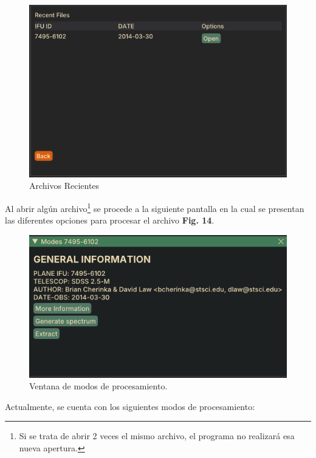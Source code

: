 \documentclass[9pt,twocolumn,a4paper]{opticajnl}
\begin{document}
\begin{figure}
    \centering
    \includegraphics[width=1\linewidth]{recent_files.png}
    \caption{Archivos Recientes}
    \label{fig:recent_files}
\end{figure}

Al abrir algún archivo\footnote{Si se trata de abrir 2 veces el mismo archivo, el programa no realizará esa nueva apertura.} se procede a la siguiente pantalla en la cual se presentan las diferentes opciones para procesar el archivo \textbf{Fig. 14}.

\begin{figure}
    \centering
    \includegraphics[width=1\linewidth]{modes.png}
    \caption{Ventana de modos de procesamiento.}
    \label{fig:modes}
\end{figure}

Actualmente, se cuenta con los siguientes modos de procesamiento:
\end{document}
